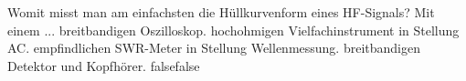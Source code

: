     {Womit misst man am einfachsten die Hüllkurvenform eines HF-Signals? Mit einem ...}
    {breitbandigen Oszilloskop.}
    {hochohmigen Vielfachinstrument in Stellung AC.}
    {empfindlichen SWR-Meter in Stellung Wellenmessung.}
    {breitbandigen Detektor und Kopfhörer.}
    {false}{false}
